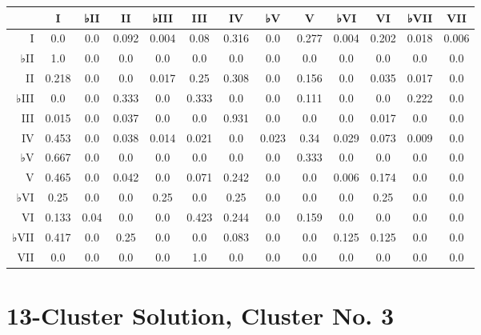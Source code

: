 \begin{table}[htbp]
\begin{minipage}{\linewidth}
\setlength{\tymax}{0.5\linewidth}
\centering
\small
\begin{tabulary}{\textwidth}{@{}RCCCCCCCCCCCC@{}} \toprule
&I&♭II&II&♭III&III&IV&♭V&V&♭VI&VI&♭VII&VII\\
\midrule
I&0.0&0.0&0.092&0.004&0.08&0.316&0.0&0.277&0.004&0.202&0.018&0.006\\
♭II&1.0&0.0&0.0&0.0&0.0&0.0&0.0&0.0&0.0&0.0&0.0&0.0\\
II&0.218&0.0&0.0&0.017&0.25&0.308&0.0&0.156&0.0&0.035&0.017&0.0\\
♭III&0.0&0.0&0.333&0.0&0.333&0.0&0.0&0.111&0.0&0.0&0.222&0.0\\
III&0.015&0.0&0.037&0.0&0.0&0.931&0.0&0.0&0.0&0.017&0.0&0.0\\
IV&0.453&0.0&0.038&0.014&0.021&0.0&0.023&0.34&0.029&0.073&0.009&0.0\\
♭V&0.667&0.0&0.0&0.0&0.0&0.0&0.0&0.333&0.0&0.0&0.0&0.0\\
V&0.465&0.0&0.042&0.0&0.071&0.242&0.0&0.0&0.006&0.174&0.0&0.0\\
♭VI&0.25&0.0&0.0&0.25&0.0&0.25&0.0&0.0&0.0&0.25&0.0&0.0\\
VI&0.133&0.04&0.0&0.0&0.423&0.244&0.0&0.159&0.0&0.0&0.0&0.0\\
♭VII&0.417&0.0&0.25&0.0&0.0&0.083&0.0&0.0&0.125&0.125&0.0&0.0\\
VII&0.0&0.0&0.0&0.0&1.0&0.0&0.0&0.0&0.0&0.0&0.0&0.0\\

\bottomrule

\end{tabulary}
\end{minipage}
\end{table}

\section{13-Cluster Solution, Cluster No. 3}
\label{13-clustersolutionclusterno.3}

